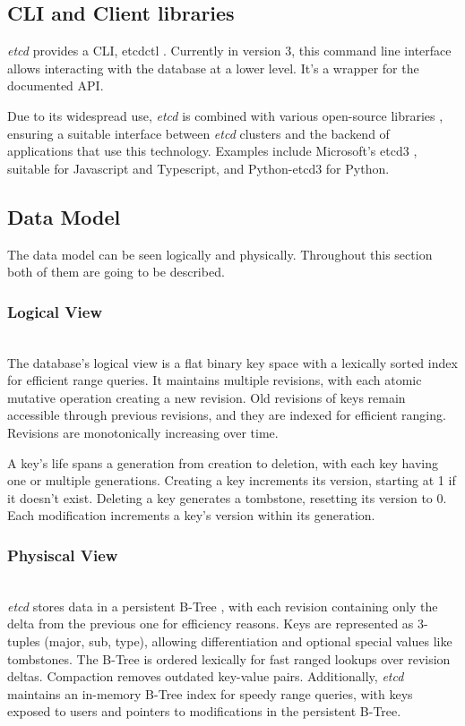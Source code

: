 \documentclass[screen,review]{acmart}
\begin{document}
\subsection{CLI and Client libraries}

\textit{etcd} provides a CLI, etcdctl \cite{etcd_clt}. Currently in version 3, this command line interface allows interacting with the database at a lower level. It's a wrapper for the documented API.

Due to its widespread use, \textit{etcd} is combined with various open-source libraries \cite{etcd_library}, ensuring a suitable interface between \textit{etcd} clusters and the backend of applications that use this technology. Examples include Microsoft's etcd3 \cite{etcd_microsoft}, suitable for Javascript and Typescript, and Python-etcd3 \cite{etcd_python} for Python.

\subsection{Data Model}
The data model \cite{etcd_data_model} can be seen logically and physically. Throughout this section both of them are going to be described. \\

\subsubsection{Logical View}~\\
The database's logical view is a flat binary key space with a lexically sorted index for efficient range queries. It maintains multiple revisions, with each atomic mutative operation creating a new revision. Old revisions of keys remain accessible through previous revisions, and they are indexed for efficient ranging. Revisions are monotonically increasing over time.

A key's life spans a generation from creation to deletion, with each key having one or multiple generations. Creating a key increments its version, starting at 1 if it doesn't exist. Deleting a key generates a tombstone, resetting its version to 0. Each modification increments a key's version within its generation. \\

\subsubsection{Physiscal View}~\\
\textit{etcd} stores data in a persistent B-Tree \cite{b-tree}, with each revision containing only the delta from the previous one for efficiency reasons. Keys are represented as 3-tuples (major, sub, type), allowing differentiation and optional special values like tombstones. The B-Tree is ordered lexically for fast ranged lookups over revision deltas. Compaction removes outdated key-value pairs. Additionally, \textit{etcd} maintains an in-memory B-Tree index for speedy range queries, with keys exposed to users and pointers to modifications in the persistent B-Tree.
\end{document}
